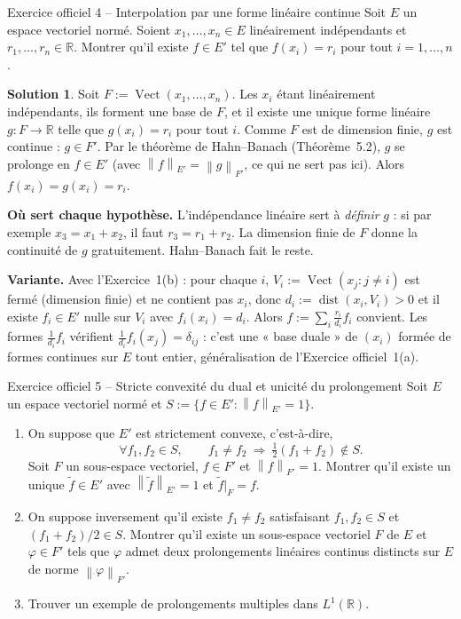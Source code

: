 \documentclass[11pt,a4paper]{article}
\newcommand{\R}{\mathbb{R}}
\newcommand{\dist}{\operatorname{dist}}
\newcommand{\Vect}{\operatorname{Vect}}
\newcommand{\norm}[1]{\left\|#1\right\|}
\theoremstyle{definition}
\newtheorem*{solution}{Solution}
\begin{document}
\begin{exo}{Exercice officiel 4 -- Interpolation par une forme linéaire continue}
Soit $E$ un espace vectoriel normé. Soient $x_1,\dots,x_n\in E$ linéairement indépendants et $r_1,\dots,r_n\in\R$. Montrer qu'il existe $f\in E'$ tel que $f(x_i)=r_i$ pour tout $i=1,\dots,n$.
\end{exo}

\begin{solution}
Soit $F:=\Vect(x_1,\dots,x_n)$. Les $x_i$ étant linéairement indépendants, ils forment une base de $F$, et il existe une unique forme linéaire $g:F\to\R$ telle que $g(x_i)=r_i$ pour tout $i$. Comme $F$ est de dimension finie, $g$ est continue : $g\in F'$. Par le théorème de Hahn--Banach (Théorème~5.2), $g$ se prolonge en $f\in E'$ (avec $\norm f_{E'}=\norm g_{F'}$, ce qui ne sert pas ici). Alors $f(x_i)=g(x_i)=r_i$.
\end{solution}

\begin{commentaire}
\textbf{Où sert chaque hypothèse.} L'indépendance linéaire sert à \emph{définir} $g$ : si par exemple $x_3=x_1+x_2$, il faut $r_3=r_1+r_2$. La dimension finie de $F$ donne la continuité de $g$ gratuitement. Hahn--Banach fait le reste.

\textbf{Variante.} Avec l'Exercice~1(b) : pour chaque $i$, $V_i:=\Vect(x_j:j\ne i)$ est fermé (dimension finie) et ne contient pas $x_i$, donc $d_i:=\dist(x_i,V_i)>0$ et il existe $f_i\in E'$ nulle sur $V_i$ avec $f_i(x_i)=d_i$. Alors $f:=\sum_i\frac{r_i}{d_i}f_i$ convient. Les formes $\frac1{d_i}f_i$ vérifient $\frac1{d_i}f_i(x_j)=\delta_{ij}$ : c'est une « base duale » de $(x_i)$ formée de formes continues sur $E$ tout entier, généralisation de l'Exercice officiel~1(a).
\end{commentaire}

\begin{exo}{Exercice officiel 5 -- Stricte convexité du dual et unicité du prolongement}
Soit $E$ un espace vectoriel normé et $S:=\{f\in E':\norm f_{E'}=1\}$.
\begin{enumerate}[label=(\alph*)]
  \item On suppose que $E'$ est strictement convexe, c'est-à-dire,
  \[
  \forall f_1,f_2\in S,\qquad f_1\ne f_2\ \Rightarrow\ \tfrac12(f_1+f_2)\notin S .
  \]
  Soit $F$ un sous-espace vectoriel, $f\in F'$ et $\norm f_{F'}=1$. Montrer qu'il existe un unique $\tilde f\in E'$ avec $\norm{\tilde f}_{E'}=1$ et $\tilde f|_F=f$.
  \item On suppose inversement qu'il existe $f_1\ne f_2$ satisfaisant $f_1,f_2\in S$ et $(f_1+f_2)/2\in S$. Montrer qu'il existe un sous-espace vectoriel $F$ de $E$ et $\varphi\in F'$ tels que $\varphi$ admet deux prolongements linéaires continus distincts sur $E$ de norme $\norm\varphi_{F'}$.
  \item Trouver un exemple de prolongements multiples dans $L^1(\R)$.
\end{enumerate}
\end{exo}
\end{document}
